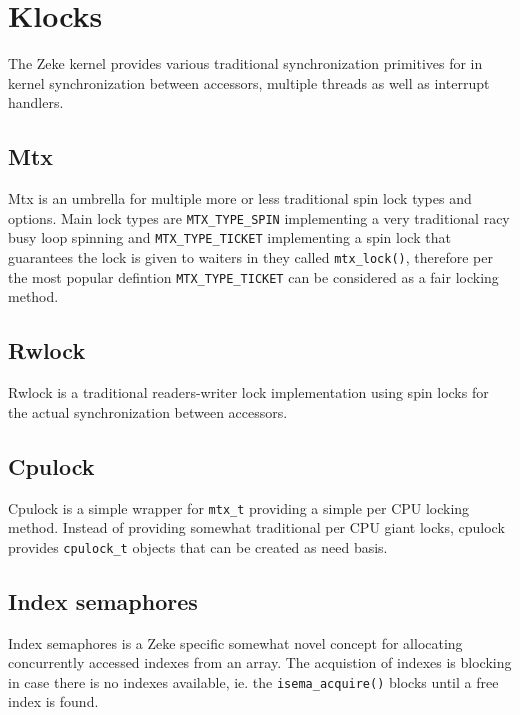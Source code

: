 \chapter{Klocks}

The Zeke kernel provides various traditional synchronization primitives for in
kernel synchronization between accessors, multiple threads as well as interrupt
handlers.

\section{Mtx}

Mtx is an umbrella for multiple more or less traditional spin lock types and
options. Main lock types are \verb+MTX_TYPE_SPIN+ implementing a very
traditional racy busy loop spinning and \verb+MTX_TYPE_TICKET+ implementing
a spin lock that guarantees the lock is given to waiters in they called
\verb+mtx_lock()+, therefore per the most popular defintion
\verb+MTX_TYPE_TICKET+ can be considered as a fair locking method.

\section{Rwlock}

Rwlock is a traditional readers-writer lock implementation using spin locks
for the actual synchronization between accessors.

\section{Cpulock}

Cpulock is a simple wrapper for \verb+mtx_t+ providing a simple per CPU locking
method. Instead of providing somewhat traditional per CPU giant locks, cpulock
provides \verb+cpulock_t+ objects that can be created as need basis.

\section{Index semaphores}

Index semaphores is a Zeke specific somewhat novel concept for allocating
concurrently accessed indexes from an array. The acquistion of indexes is
blocking in case there is no indexes available, ie. the \verb+isema_acquire()+
blocks until a free index is found.
